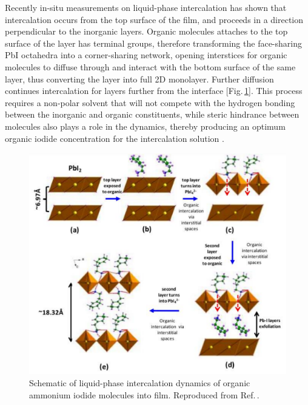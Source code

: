 Recently in-situ measurements on liquid-phase intercalation has shown that intercalation occurs from the top surface of the  film, and proceeds in a direction perpendicular to the inorganic layers. Organic molecules attaches to the top surface of the  layer has terminal groups, therefore transforming the face-sharing PbI octahedra into a corner-sharing network, opening interstices for organic molecules to diffuse through and interact with the bottom surface of the same layer, thus converting the  layer into full 2D monolayer. Further diffusion continues intercalation for layers further from the interface [Fig.\,\ref{2Fig7}]. This process requires a non-polar solvent that will not compete with the hydrogen bonding between the inorganic and organic constituents, while steric hindrance between molecules also plays a role in the dynamics, thereby producing an optimum organic iodide concentration for the intercalation solution \cite{Ahmad2014}.

\begin{figure} [ht]
\centering
\includegraphics[width=\textwidth]{Fig7}
\caption{Schematic of liquid-phase intercalation dynamics of organic ammonium iodide molecules into  film. Reproduced from Ref.\,\cite{Ahmad2014}.}
\label{2Fig7}
\end{figure}

